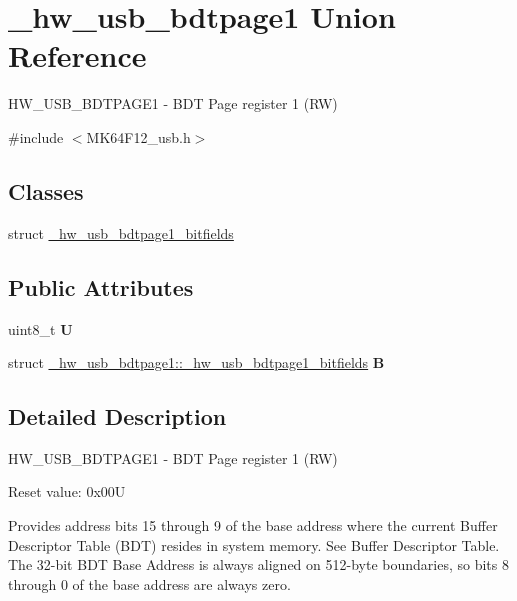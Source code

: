 \hypertarget{union__hw__usb__bdtpage1}{}\section{\+\_\+hw\+\_\+usb\+\_\+bdtpage1 Union Reference}
\label{union__hw__usb__bdtpage1}


H\+W\+\_\+\+U\+S\+B\+\_\+\+B\+D\+T\+P\+A\+G\+E1 -\/ B\+DT Page register 1 (RW)  




{\ttfamily \#include $<$M\+K64\+F12\+\_\+usb.\+h$>$}

\subsection*{Classes}
\begin{DoxyCompactItemize}
\item 
struct \hyperlink{struct__hw__usb__bdtpage1_1_1__hw__usb__bdtpage1__bitfields}{\+\_\+hw\+\_\+usb\+\_\+bdtpage1\+\_\+bitfields}
\end{DoxyCompactItemize}
\subsection*{Public Attributes}
\begin{DoxyCompactItemize}
\item 
uint8\+\_\+t {\bfseries U}\hypertarget{union__hw__usb__bdtpage1_a9027b5893aec38ea40c13f12b567ae82}{}\label{union__hw__usb__bdtpage1_a9027b5893aec38ea40c13f12b567ae82}

\item 
struct \hyperlink{struct__hw__usb__bdtpage1_1_1__hw__usb__bdtpage1__bitfields}{\+\_\+hw\+\_\+usb\+\_\+bdtpage1\+::\+\_\+hw\+\_\+usb\+\_\+bdtpage1\+\_\+bitfields} {\bfseries B}\hypertarget{union__hw__usb__bdtpage1_a817d217c50db515b916b4cec9e748981}{}\label{union__hw__usb__bdtpage1_a817d217c50db515b916b4cec9e748981}

\end{DoxyCompactItemize}


\subsection{Detailed Description}
H\+W\+\_\+\+U\+S\+B\+\_\+\+B\+D\+T\+P\+A\+G\+E1 -\/ B\+DT Page register 1 (RW) 

Reset value\+: 0x00U

Provides address bits 15 through 9 of the base address where the current Buffer Descriptor Table (B\+DT) resides in system memory. See Buffer Descriptor Table. The 32-\/bit B\+DT Base Address is always aligned on 512-\/byte boundaries, so bits 8 through 0 of the base address are always zero. 

